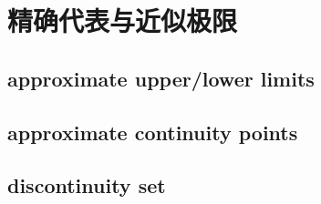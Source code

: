 \section{精确代表与近似极限}
\label{b1:sec:2801}


\subsection{approximate upper/lower limits}
\label{b1:subsec:280101}

\subsection{approximate continuity points}
\label{b1:subsec:280102}

\subsection{discontinuity set}
\label{b1:subsec:280103}


